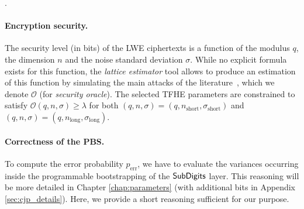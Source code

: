 \begin{table}[t!]
\centering
\caption{TFHE Parameters used in our experiments}.
\label{tab:parameters}
\renewcommand{\arraystretch}{1.3}  %
	\end{table}



\paragraph{Encryption security.} 
The security level (in bits) of the LWE ciphertexts is a function of the modulus $q$, the dimension $n$ and the noise standard deviation $\sigma$. While no explicit formula exists for this function, the \emph{lattice estimator} tool allows to produce an estimation of this function by simulating the main attacks of the literature~\cite{lattice-estimator}, which we denote $\mathcal{O}$ (for \emph{security oracle}). The selected TFHE parameters are constrained to satisfy $\mathcal{O}(q,n,\sigma) \geq \lambda$ for both $(q,n,\sigma) = (q,n_{\text{short}},\sigma_{\text{short}})$ and $(q,n,\sigma) = (q,n_{\text{long}},\sigma_{\text{long}})$.



\paragraph{Correctness of the PBS.} To compute the error probability $p_{\text{err}}$, we have to evaluate the variances occurring inside the programmable bootstrapping of the $\text{\textsf{SubDigits}}$ layer. This reasoning will be more detailed in Chapter \ref{chap:parameters} (with additional bits in Appendix \ref{sec:cjp_details}). Here, we provide a short reasoning sufficient for our purpose.


